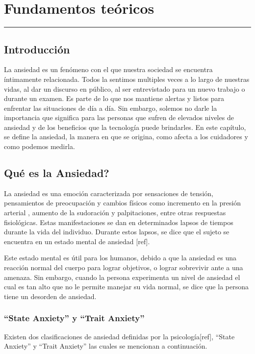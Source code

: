 \chapter{Fundamentos te\'oricos}\label{capit:cap2}
\vspace{-2.0325ex}%
\noindent
\rule{\textwidth}{0.5pt}
\vspace{-5.5ex}%
\newcommand{\pushline}{\Indp}%

\section{Introducci\'on}\label{secc:introduccion}
La ansiedad es un fen\'omeno con el que nuestra sociedad se encuentra \'intimamente relacionada. Todos la sentimos multiples veces a lo largo de nuestras vidas, al dar un discurso en p\'ublico, al ser entrevistado para un nuevo trabajo o durante un examen. Es parte de lo que nos mantiene alertas y listos para enfrentar las situaciones de d\'ia a d\'ia. Sin embargo, solemos no darle la importancia que significa para las personas que sufren de elevados niveles de ansiedad y de los beneficios que la tecnolog\'ia puede brindarles. En este cap\'itulo, se define la ansiedad, la manera en que se origina, como afecta a los cuidadores y como podemos medirla.



\section{Qu\'e es la Ansiedad?}\label{secc:ansiedad}

La ansiedad es una emoci\'on caracterizada por sensaciones de tensi\'on, pensamientos de preocupaci\'on y cambios f\'isicos como incremento en la presi\'on arterial \citep{psychologyapa}, aumento de la sudoraci\'on y palpitaciones, entre otras respuestas fisiol\'ogicas. Estas manifestaciones se dan en determinados lapsos de tiempos durante la vida del individuo. Durante estos lapsos, se dice que el sujeto se encuentra en un estado mental de ansiedad [ref].

Este estado mental es \'util para los humanos, debido a que la ansiedad es una reacci\'on normal del cuerpo para lograr objetivos, o lograr sobrevivir ante a una amenaza. Sin embargo, cuando la persona experimenta un nivel de ansiedad el cual es tan alto que no le permite manejar su vida normal, se dice que la persona tiene un desorden de ansiedad\citep{repetto2013}. 


\subsection{``State Anxiety'' y ``Trait Anxiety''}\label{secc:anxieystatevstrait}
Existen dos clasificaciones de ansiedad definidas por la psicolog\'ia[ref], ``State Anxiety'' y ``Trait Anxiety'' las cuales se mencionan a continuaci\'on.

